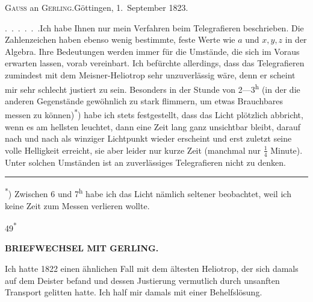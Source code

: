 \begingroup
\newcommand{\GerlingSeptSeconds}[2]{#1\makebox[.42em][c]{,\makebox[0pt][r]{\textsuperscript{s}}}#2}
\begin{center}
\textsc{Gauss} an \textsc{Gerling}.\quad Göttingen, 1.~September 1823.
\end{center}

\par\noindent\hspace*{\parindent}\mbox{.\ .\ .\ .\ .\ .\quad Ich} habe Ihnen nur mein Verfahren beim Telegrafieren beschrieben. Die Zahlenzeichen haben ebenso wenig bestimmte, feste Werte wie \(a\) und \(x,y,z\) in der Algebra. Ihre Bedeutungen werden immer für die Umstände, die sich im Voraus erwarten lassen, vorab vereinbart.
Ich befürchte allerdings, dass das Telegrafieren zumindest mit dem Meisner-Heliotrop sehr unzuverlässig wäre, denn er scheint mir sehr schlecht justiert zu sein.
Besonders in der Stunde von 2---3\textsuperscript{h} (in der die anderen Gegenstände gewöhnlich zu stark flimmern, um etwas Brauchbares messen zu können)\textsuperscript{*}) habe ich stets festgestellt, dass das Licht plötzlich abbricht, wenn es am hellsten leuchtet, dann eine Zeit lang ganz unsichtbar bleibt, darauf nach und nach als winziger Lichtpunkt wieder erscheint und erst zuletzt seine volle Helligkeit erreicht, sie aber leider nur kurze Zeit  (manchmal nur \(\frac{1}{4}\) Minute). Unter solchen Umständen ist an zuverlässiges Telegrafieren nicht zu denken.
\par\smallskip\noindent\rule{.24\linewidth}{.4pt}\par\nobreak
{\footnotesize\noindent\hspace*{\parindent}\textsuperscript{*}) Zwischen 6 und 7\textsuperscript{h} habe ich das Licht nämlich seltener beobachtet, weil ich keine Zeit zum Messen verlieren wollte.\par}
\smallskip\noindent\hfill{\small49\textsuperscript{*}}\hspace*{.123\linewidth}\par
\clearpage
\noindent{}\hfill{\small\textbf{BRIEFWECHSEL MIT GERLING.}}\hfill\null\par\medskip
\par\noindent\hspace*{\parindent}Ich hatte 1822 einen ähnlichen Fall mit dem ältesten Heliotrop, der sich damals auf dem Deister befand und dessen Justierung vermutlich durch unsanften Transport gelitten hatte.
Ich half mir damals mit einer Behelfslösung.
